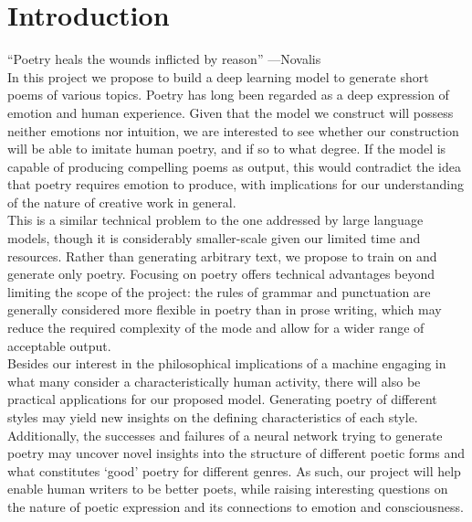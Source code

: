 \documentclass{article} %
\begin{document}
\section{Introduction}
“Poetry heals the wounds inflicted by reason” —Novalis\\

In this project we propose to build a deep learning model to generate short poems of various topics. 
Poetry has long been regarded as a deep expression of emotion and human experience. 
Given that the model we construct will possess neither emotions nor intuition, 
we are interested to see whether our construction will be able to imitate human poetry, 
and if so to what degree. If the model is capable of producing compelling poems as output, 
this would contradict the idea that poetry requires emotion to produce, 
with implications for our understanding of the nature of creative work in general.\\

This is a similar technical problem to the one addressed by large language models,
though it is considerably smaller-scale given our limited time and resources. Rather than generating arbitrary text,
we propose to train on and generate only poetry. Focusing on poetry offers technical advantages beyond limiting the scope of the project: 
the rules of grammar and punctuation are generally considered more flexible in poetry than in prose writing,
which may reduce the required complexity of the mode and allow for a wider range of acceptable output.\\

Besides our interest in the philosophical implications of a machine engaging in what many consider a characteristically human activity,
there will also be practical applications for our proposed model.
Generating poetry of different styles may yield new insights on the defining characteristics of each style. 
Additionally, the successes and failures of a neural network trying to generate poetry may uncover novel insights into the structure of different poetic forms and what constitutes ‘good’ poetry for different genres.
As such, our project will help enable human writers to be better poets, while raising interesting questions on the nature of poetic expression and its connections to emotion and consciousness.\\
\end{document}
